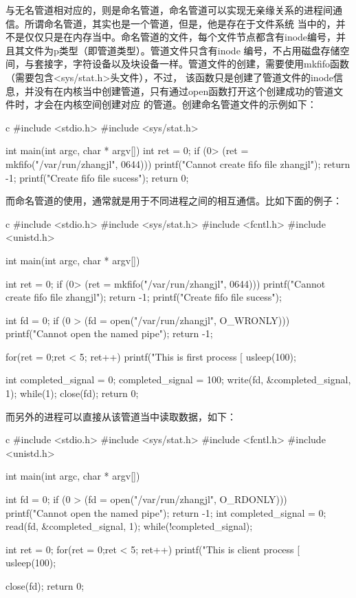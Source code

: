 与无名管道相对应的，则是命名管道，命名管道可以实现无亲缘关系的进程间通信。所谓命名管道，其实也是一个管道，但是，他是存在于文件系统
当中的，并不是仅仅只是在内存当中。命名管道的文件，每个文件节点都含有inode编号，并且其文件为p类型（即管道类型）。管道文件只含有inode
编号，不占用磁盘存储空间，与套接字，字符设备以及块设备一样。管道文件的创建，需要使用mkfifo函数（需要包含<sys/stat.h>头文件），不过，
该函数只是创建了管道文件的inode信息，并没有在内核当中创建管道，只有通过open函数打开这个创建成功的管道文件时，才会在内核空间创建对应
的管道。创建命名管道文件的示例如下：
\begin{code-block}{c}
#include <stdio.h>
#include <sys/stat.h>

int main(int argc, char * argv[])
{
        int ret = 0;
        if (0> (ret = mkfifo("/var/run/zhangjl", 0644)))
        {
                printf("Cannot create fifo file zhangjl\n");
                return -1;
        }
        printf("Create fifo file sucess\n");
        return 0;
}
\end{code-block}

而命名管道的使用，通常就是用于不同进程之间的相互通信。比如下面的例子：
\begin{code-block}{c}
#include <stdio.h>
#include <sys/stat.h>
#include <fcntl.h>
#include <unistd.h>

int main(int argc, char * argv[])
{
        int ret = 0;
        if (0> (ret = mkfifo("/var/run/zhangjl", 0644)))
        {
                printf("Cannot create fifo file zhangjl\n");
                return -1;
        }
        printf("Create fifo file sucess\n");

        int fd = 0;
        if (0 > (fd = open("/var/run/zhangjl", O_WRONLY)))
        {
                printf("Cannot open the named pipe\n");
                return -1;
        }

        for(ret = 0;ret < 5; ret++)
        {
                printf("This is first process [%
                usleep(100);
        }

        int completed_signal = 0;
        completed_signal = 100;
        write(fd, &completed_signal, 1);
        while(1);
        close(fd);
        return 0;
}
\end{code-block}

而另外的进程可以直接从该管道当中读取数据，如下：
\begin{code-block}{c}
#include <stdio.h>
#include <sys/stat.h>
#include <fcntl.h>
#include <unistd.h>

int main(int argc, char * argv[])
{
        int fd = 0;
        if (0 > (fd = open("/var/run/zhangjl", O_RDONLY)))
        {
                printf("Cannot open the named pipe\n");
                return -1;
        }
        int completed_signal = 0;
        read(fd, &completed_signal, 1);
        while(!completed_signal);

        int ret = 0;
        for(ret = 0;ret < 5; ret++)
        {
                printf("This is client process [%
                usleep(100);
        }

        close(fd);
        return 0;
}
\end{code-block}

